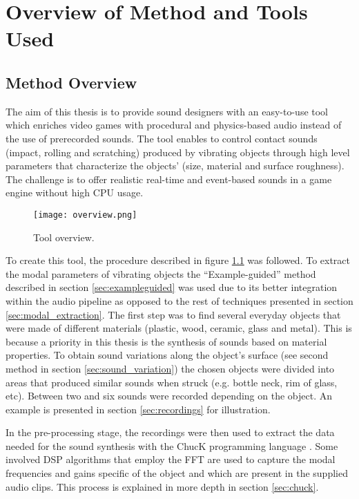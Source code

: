 \chapter{Overview of Method and Tools Used}\label{ch:method}

\section{Method Overview}
The aim of this thesis is to provide sound designers with an easy-to-use tool which enriches video games with procedural and physics-based audio instead of the use of prerecorded sounds. The tool enables to control contact sounds (impact, rolling and scratching) produced by vibrating objects through high level parameters that characterize the objects' (size, material and surface roughness). The challenge is to offer realistic real-time and event-based sounds in a game engine without high \gls{CPU} usage.

\begin{figure}[H]
  \centering
    \texttt{[image: overview.png]}
      \caption{Tool overview.}
      \label{fig:synth_proc}
\end{figure}

To create this tool, the procedure described in figure \ref{fig:synth_proc} was followed. To extract the modal parameters of vibrating objects the ``Example-guided'' method described in section \ref{sec:exampleguided} was used due to its better integration within the audio pipeline as opposed to the rest of techniques presented in section \ref{sec:modal_extraction}. The first step was to find several everyday objects that were made of different materials (plastic, wood, ceramic, glass and metal). This is because a priority in this thesis is the synthesis of sounds based on material properties. To obtain sound variations along the object's surface (see second method in section \ref{sec:sound_variation}) the chosen objects were divided into areas that produced similar sounds when struck (e.g. bottle neck, rim of glass, etc). Between two and six sounds were recorded depending on the object. An example is presented in section \ref{sec:recordings} for illustration.

In the pre-processing stage, the recordings were then used to extract the data needed for the sound synthesis with the ChucK programming language \cite{bib:chuck}. Some involved \gls{DSP} algorithms that employ the \gls{FFT} are used to capture the modal frequencies and gains specific of the object and which are present in the supplied audio clips. This process is explained in more depth in section \ref{sec:chuck}. 

